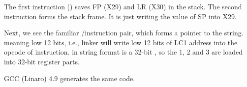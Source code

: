 




The first instruction  () saves \ac{FP} (X29) and \ac{LR} (X30) in the stack.
The second  instruction forms the stack frame.
It is just writing the value of \ac{SP} into X29.

Next, we see the familiar /\ADD instruction pair, which forms a pointer to the string.
 meaning low 12 bits, i.e., linker will write low 12 bits of LC1 address into the opcode of \ADD instruction.
 in \printf string format is a 32-bit \Tint, so the 1, 2 and 3 are loaded into 32-bit register parts.

\Optimizing GCC (Linaro) 4.9 generates the same code.

